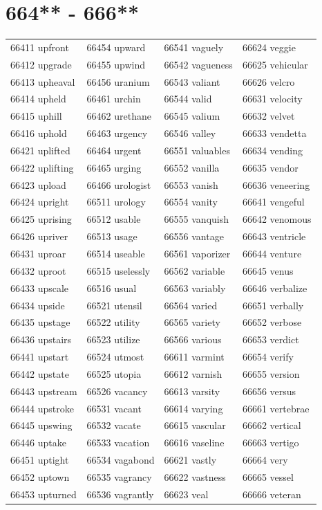 \documentclass[10pt, oneside]{book}
\begin{document}
\begin{table}
	\centering
	\section*{664** - 666**}
	\begin{tabular}{l l l l}
66411 upfront &66454 upward &66541 vaguely &66624 veggie\\
66412 upgrade &66455 upwind &66542 vagueness &66625 vehicular\\
66413 upheaval &66456 uranium &66543 valiant &66626 velcro\\
66414 upheld &66461 urchin &66544 valid &66631 velocity\\
66415 uphill &66462 urethane &66545 valium &66632 velvet\\
66416 uphold &66463 urgency &66546 valley &66633 vendetta\\
66421 uplifted &66464 urgent &66551 valuables &66634 vending\\
66422 uplifting &66465 urging &66552 vanilla &66635 vendor\\
66423 upload &66466 urologist &66553 vanish &66636 veneering\\
66424 upright &66511 urology &66554 vanity &66641 vengeful\\
66425 uprising &66512 usable &66555 vanquish &66642 venomous\\
66426 upriver &66513 usage &66556 vantage &66643 ventricle\\
66431 uproar &66514 useable &66561 vaporizer &66644 venture\\
66432 uproot &66515 uselessly &66562 variable &66645 venus\\
66433 upscale &66516 usual &66563 variably &66646 verbalize\\
66434 upside &66521 utensil &66564 varied &66651 verbally\\
66435 upstage &66522 utility &66565 variety &66652 verbose\\
66436 upstairs &66523 utilize &66566 various &66653 verdict\\
66441 upstart &66524 utmost &66611 varmint &66654 verify\\
66442 upstate &66525 utopia &66612 varnish &66655 version\\
66443 upstream &66526 vacancy &66613 varsity &66656 versus\\
66444 upstroke &66531 vacant &66614 varying &66661 vertebrae\\
66445 upswing &66532 vacate &66615 vascular &66662 vertical\\
66446 uptake &66533 vacation &66616 vaseline &66663 vertigo\\
66451 uptight &66534 vagabond &66621 vastly &66664 very\\
66452 uptown &66535 vagrancy &66622 vastness &66665 vessel\\
66453 upturned &66536 vagrantly &66623 veal &66666 veteran\\
	\end{tabular}
 \end{table}
\clearpage
\end{document}
